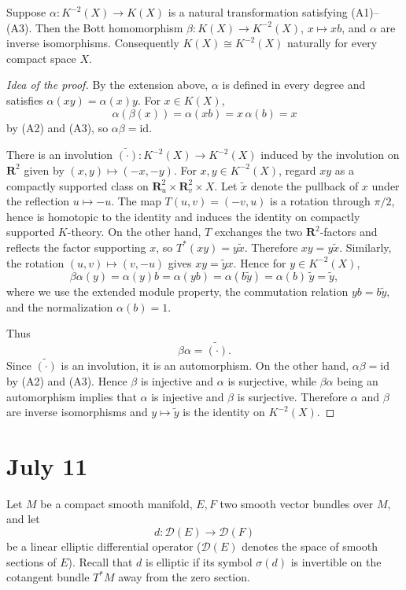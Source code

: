 \documentclass[12pt]{article}
\begin{document}
\begin{proposition}
Suppose $\alpha:K^{-2}(X)\to K(X)$ is a natural transformation satisfying (A1)--(A3). Then
the Bott homomorphism $\beta:K(X)\to K^{-2}(X)$, $x\mapsto xb$, and $\alpha$ are inverse
isomorphisms. Consequently $K(X)\cong K^{-2}(X)$ naturally for every compact space $X$.
\end{proposition}

\begin{proof}[Idea of the proof]
By the extension above, $\alpha$ is defined in every degree and satisfies
$\alpha(xy)=\alpha(x)y$. For $x\in K(X)$,
\[
\alpha(\beta(x)) = \alpha(xb) = x\,\alpha(b) = x
\]
by (A2) and (A3), so $\alpha\beta=\mathrm{id}$.


There is an involution $\widetilde{(\cdot)}:K^{-2}(X)\to K^{-2}(X)$ induced by the involution on $\mathbf R^2$ given by $(x,y)\mapsto(-x,-y)$. For $x,y\in K^{-2}(X)$, regard $xy$ as a compactly supported
class on $\mathbf R^2_u\times\mathbf R^2_v\times X$. Let
$\widetilde x$ denote the pullback of $x$ under the reflection
$u\mapsto -u$. The map
$T(u,v)=(-v,u)$ is a rotation through $\pi/2$, hence is homotopic
to the identity and induces the identity on compactly supported
$K$-theory. On the other hand, $T$ exchanges the two
$\mathbf R^2$-factors and reflects the factor supporting $x$, so
$T^*(xy)=y\widetilde x$. Therefore $xy=y\widetilde x$. Similarly,
the rotation $(u,v)\mapsto(v,-u)$ gives $xy=\widetilde yx$. Hence for $y\in K^{-2}(X)$,
\[
\beta\alpha(y)
=
\alpha(y)b
=
\alpha(yb)
=
\alpha(b\widetilde y)
=
\alpha(b)\,\widetilde y
=
\widetilde y,
\]
where we use the extended module property, the commutation relation
$yb=b\widetilde y$, and the normalization $\alpha(b)=1$.

Thus
\[
\beta\alpha=\widetilde{(\cdot)}.
\]
Since $\widetilde{(\cdot)}$ is an involution, it is an automorphism. On the other hand, $\alpha\beta=\mathrm{id}$
by (A2) and (A3). Hence $\beta$ is injective and $\alpha$ is surjective, while
$\beta\alpha$ being an automorphism implies that $\alpha$ is injective and
$\beta$ is surjective. Therefore $\alpha$ and $\beta$ are inverse
isomorphisms and $y\mapsto \widetilde y$ is the identity on $K^{-2}(X)$.
\end{proof}

\section{July 11}
Let $M$ be a compact smooth manifold, $E,F$ two smooth vector bundles over $M$, and let
\[d:\mathscr D(E)\to\mathscr D(F)\] be a linear elliptic differential operator ($\mathscr
D(E)$ denotes the space of smooth sections of $E$). Recall that $d$ is elliptic if its symbol $\sigma(d)$ is invertible on the cotangent bundle $T^*M$ away from the zero section.
\end{document}
